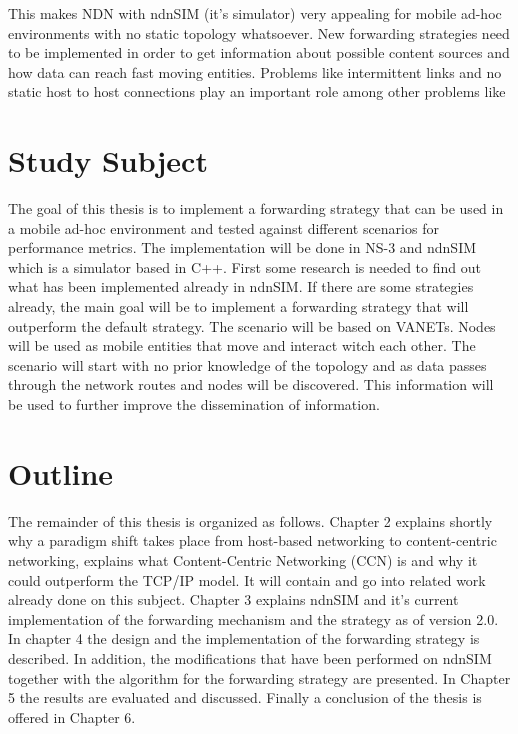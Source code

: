 This makes NDN with ndnSIM (it's simulator) very appealing for mobile ad-hoc environments with no static topology whatsoever. New forwarding strategies need to be implemented in order to get information about possible content sources and how data can reach fast moving entities. Problems like intermittent links and no static host to host connections play an important role among other problems like 

\section{Study Subject}

The goal of this thesis is to implement a forwarding strategy that can be used in a mobile ad-hoc environment and tested against different scenarios for performance metrics. The implementation will be done in NS-3 and ndnSIM which is a simulator based in C++. First some research is needed to find out what has been implemented already in ndnSIM. If there are some strategies already, the main goal will be to implement a forwarding strategy that will outperform the default strategy. The scenario will be based on VANETs. Nodes will be used as mobile entities that move and interact witch each other. The scenario will start with no prior knowledge of the topology and as data passes through the network routes and nodes will be discovered. This information will be used to further improve the dissemination of information.

\section{Outline}

The remainder of this thesis is organized as follows. Chapter 2 explains shortly why a paradigm shift takes place from host-based networking to content-centric networking, explains what Content-Centric Networking (CCN) is and why it could outperform the TCP/IP model. It will contain and go into related work already done on this subject. Chapter 3 explains ndnSIM and it's current implementation of the forwarding mechanism and the strategy as of version 2.0. In chapter 4 the design and the implementation of the forwarding strategy is described. In addition, the modifications that have been performed on ndnSIM together with the algorithm for the forwarding strategy are presented. In Chapter 5 the results are evaluated and discussed. Finally a conclusion of the thesis is offered in Chapter 6.
